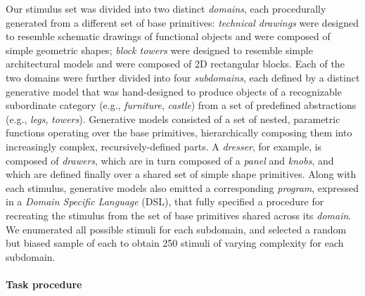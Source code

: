 \documentclass[10pt,letterpaper]{article}
\begin{document}

Our stimulus set was divided into two distinct \textit{domains}, each procedurally generated from a different set of base primitives:
\textit{technical drawings} were designed to resemble schematic drawings of functional objects and were composed of simple geometric shapes; 
\textit{block towers} were designed to resemble simple architectural models and were composed of 2D rectangular blocks.
Each of the two domains were further divided into four \textit{subdomains}, each defined by a distinct generative model that was hand-designed to produce objects of a recognizable subordinate category (e.g., \textit{furniture}, \textit{castle}) from a set of predefined abstractions (e.g., \textit{legs}, \textit{towers}).
Generative models consisted of a set of nested, parametric functions operating over the base primitives, hierarchically composing them into increasingly complex, recursively-defined parts.
A \textit{dresser}, for example, is composed of \textit{drawers}, which are in turn composed of a \textit{panel} and \textit{knobs}, and which are defined finally over a shared set of simple shape primitives.
Along with each stimulus, generative models also emitted a corresponding \textit{program}, expressed in a \textit{Domain Specific Language} (DSL), that fully specified a procedure for recreating the stimulus from the set of base primitives shared across its \textit{domain}.
We enumerated all possible stimuli for each subdomain, and selected a random but biased sample of each to obtain 250 stimuli of varying complexity for each subdomain.

\paragraph{Task procedure}
\end{document}
